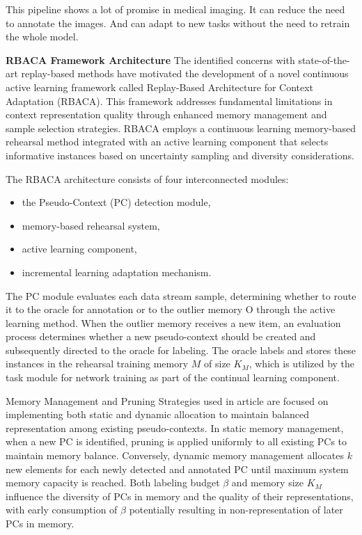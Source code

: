 \documentclass{IEEEcsmag}
\begin{document}
    This pipeline shows a lot of promise in medical imaging.
    It can reduce the need to annotate the images.
    And can adapt to new tasks without the need to retrain the whole model.
    
    \textbf{RBACA Framework Architecture}
    The identified concerns with state-of-the-art replay-based methods have motivated the development of a novel continuous active learning framework called Replay-Based Architecture for Context Adaptation (RBACA)\cite{cite-19}.
    This framework addresses fundamental limitations in context representation quality through enhanced memory management and sample selection strategies\cite{cite-19}.
    RBACA employs a continuous learning memory-based rehearsal method integrated with an active learning component that selects informative instances based on uncertainty sampling and diversity considerations\cite{cite-19}.
    
    The RBACA architecture consists of four interconnected modules\cite{cite-19}: 
    \begin{itemize}
        \item the Pseudo-Context (PC) detection module, 
        \item memory-based rehearsal system, 
        \item active learning component, 
        \item incremental learning adaptation mechanism. 
    \end{itemize}
    The PC module evaluates each data stream sample, determining whether to route it to the oracle for annotation or to the outlier memory O through the active learning method. 
    When the outlier memory receives a new item, an evaluation process determines whether a new pseudo-context should be created and subsequently directed to the oracle for labeling\cite{cite-19}.
    The oracle labels and stores these instances in the rehearsal training memory $M$ of size $K_M$, which is utilized by the task module for network training as part of the continual learning component\cite{cite-19}.

    Memory Management and Pruning Strategies used in article are focused on implementing both static and dynamic allocation to maintain balanced representation among existing pseudo-contexts\cite{cite-19}. 
    In static memory management, when a new PC is identified, pruning is applied uniformly to all existing PCs to maintain memory balance\cite{cite-19}. 
    Conversely, dynamic memory management allocates $k$ new elements for each newly detected and annotated PC until maximum system memory capacity is reached\cite{cite-19}. 
    Both labeling budget $\beta$ and memory size $K_M$ influence the diversity of PCs in memory and the quality of their representations, with early consumption of $\beta$ potentially resulting in non-representation of later PCs in memory\cite{cite-19}.
   
\end{document}
